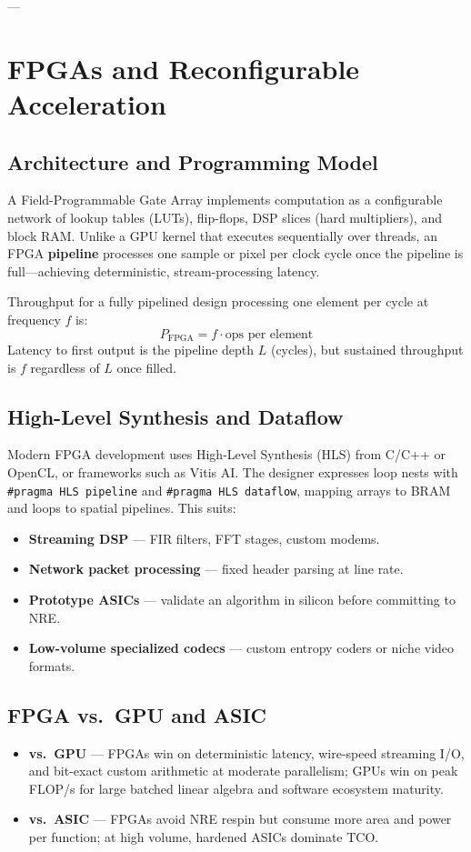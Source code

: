 \documentclass[11pt,journal,onecolumn]{IEEEtran}
\begin{document}
---

\section{FPGAs and Reconfigurable Acceleration}

\subsection{Architecture and Programming Model}
A Field-Programmable Gate Array implements computation as a configurable network of lookup tables (LUTs), flip-flops, DSP slices (hard multipliers), and block RAM. Unlike a GPU kernel that executes sequentially over threads, an FPGA \textbf{pipeline} processes one sample or pixel per clock cycle once the pipeline is full---achieving deterministic, stream-processing latency.

Throughput for a fully pipelined design processing one element per cycle at frequency $f$ is:
\begin{equation}
P_{\mathrm{FPGA}} = f \cdot \text{ops per element}
\end{equation}
Latency to first output is the pipeline depth $L$ (cycles), but sustained throughput is $f$ regardless of $L$ once filled.

\subsection{High-Level Synthesis and Dataflow}
Modern FPGA development uses High-Level Synthesis (HLS) from C/C++ or OpenCL, or frameworks such as Vitis AI. The designer expresses loop nests with \texttt{\#pragma HLS pipeline} and \texttt{\#pragma HLS dataflow}, mapping arrays to BRAM and loops to spatial pipelines. This suits:
\begin{itemize}
    \item \textbf{Streaming DSP} --- FIR filters, FFT stages, custom modems.
    \item \textbf{Network packet processing} --- fixed header parsing at line rate.
    \item \textbf{Prototype ASICs} --- validate an algorithm in silicon before committing to NRE.
    \item \textbf{Low-volume specialized codecs} --- custom entropy coders or niche video formats.
\end{itemize}

\subsection{FPGA vs.\ GPU and ASIC}
\begin{itemize}
    \item \textbf{vs.\ GPU} --- FPGAs win on deterministic latency, wire-speed streaming I/O, and bit-exact custom arithmetic at moderate parallelism; GPUs win on peak FLOP/s for large batched linear algebra and software ecosystem maturity.
    \item \textbf{vs.\ ASIC} --- FPGAs avoid NRE respin but consume more area and power per function; at high volume, hardened ASICs dominate TCO.
\end{itemize}
\end{document}
